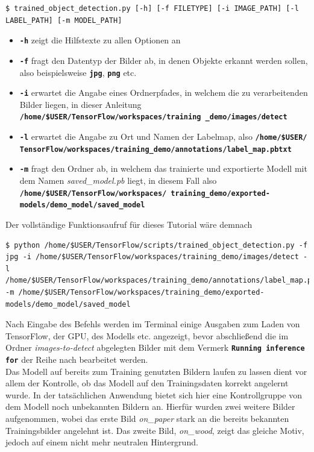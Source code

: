 \documentclass[12pt, oneside]{article}
\begin{document}
\begin{verbatim}
$ trained_object_detection.py [-h] [-f FILETYPE] [-i IMAGE_PATH] [-l LABEL_PATH] [-m MODEL_PATH]
\end{verbatim}
\begin{itemize}
	\item \textbf{\texttt{-h}} zeigt die Hilfstexte zu allen Optionen an
	\item \textbf{\texttt{-f}} fragt den Datentyp der Bilder ab, in denen Objekte erkannt werden sollen, also beispielsweise \textbf{\texttt{jpg}}, \textbf{\texttt{png}} etc.
	\item \textbf{\texttt{-i}} erwartet die Angabe eines Ordnerpfades, in welchem die zu verarbeitenden Bilder liegen, in dieser Anleitung \textbf{\texttt{/home/\$USER/TensorFlow/workspaces/training
		\_demo/images/detect}}
	\item \textbf{\texttt{-l}} erwartet die Angabe zu Ort und Namen der Labelmap, also \textbf{\texttt{/home/\$USER/ TensorFlow/workspaces/training\_demo/annotations/label\_map.pbtxt}}
	\item \textbf{\texttt{-m}} fragt den Ordner ab, in welchem das trainierte und exportierte Modell mit dem Namen \textit{saved\_model.pb} liegt, in diesem Fall also \textbf{\texttt{/home/\$USER/TensorFlow/workspaces/ training\_demo/exported-models/demo\_model/saved\_model}}
\end{itemize}
Der vollständige Funktionsaufruf für dieses Tutorial wäre demnach

\begin{verbatim}    
$ python /home/$USER/TensorFlow/scripts/trained_object_detection.py -f jpg -i /home/$USER/TensorFlow/workspaces/training_demo/images/detect -l /home/$USER/TensorFlow/workspaces/training_demo/annotations/label_map.pbtxt -m /home/$USER/TensorFlow/workspaces/training_demo/exported-models/demo_model/saved_model
\end{verbatim} 
Nach Eingabe des Befehls werden im Terminal einige Ausgaben zum Laden von TensorFlow, der GPU, des Modells etc. angezeigt, bevor abschließend die im Ordner \textit{images-to-detect} abgelegten Bilder mit dem Vermerk \textbf{\texttt{Running inference for}} der Reihe nach bearbeitet werden.\\

Das Modell auf bereits zum Training genutzten Bildern laufen zu lassen dient vor allem der Kontrolle, ob das Modell auf den Trainingsdaten korrekt angelernt wurde. In der tatsächlichen Anwendung bietet sich hier eine Kontrollgruppe von dem Modell noch unbekannten Bildern an. Hierfür wurden zwei weitere Bilder aufgenommen, wobei das erste Bild \textit{on\_paper} stark an die bereits bekannten Trainingsbilder angelehnt ist. Das zweite Bild, \textit{on\_wood}, zeigt das gleiche Motiv, jedoch auf einem nicht mehr neutralen Hintergrund.
\end{document}
